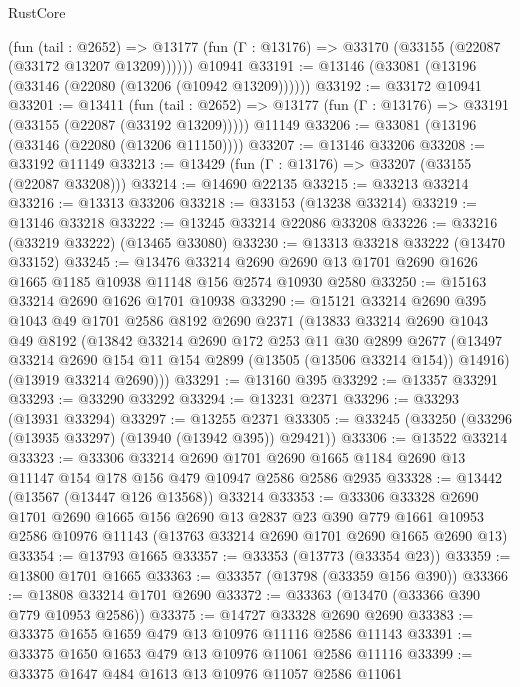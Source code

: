 \begin{lexlean}{RustCore}
\begin{coremodule}
      (fun (tail : @2652) =>
      @13177 (fun (Γ : @13176) => @33170 (@33155 (@22087 (@33172 @13207 @13209))))))
    @10941
@33191 := @13146 (@33081 (@13196 (@33146 (@22080 (@13206 (@10942 @13209))))))
@33192 := @33172 @10941
@33201 := @13411
    (fun (tail : @2652) => @13177 (fun (Γ : @13176) => @33191 (@33155 (@22087 (@33192 @13209)))))
    @11149
@33206 := @33081 (@13196 (@33146 (@22080 (@13206 @11150))))
@33207 := @13146 @33206
@33208 := @33192 @11149
@33213 := @13429 (fun (Γ : @13176) => @33207 (@33155 (@22087 @33208)))
@33214 := @14690 @22135
@33215 := @33213 @33214
@33216 := @13313 @33206
@33218 := @33153 (@13238 @33214)
@33219 := @13146 @33218
@33222 := @13245 @33214 @22086 @33208
@33226 := @33216 (@33219 @33222) (@13465 @33080)
@33230 := @13313 @33218 @33222 (@13470 @33152)
@33245 := @13476
    @33214
    @2690
    @2690
    @13
    @1701
    @2690
    @1626
    @1665
    @1185
    @10938
    @11148
    @156
    @2574
    @10930
    @2580
@33250 := @15163 @33214 @2690 @1626 @1701 @10938
@33290 := @15121
    @33214
    @2690
    @395
    @1043
    @49
    @1701
    @2586
    @8192
    @2690
    @2371
    (@13833
      @33214
      @2690
      @1043
      @49
      @8192
      (@13842
        @33214
        @2690
        @172
        @253
        @11
        @30
        @2899
        @2677
        (@13497 @33214 @2690 @154 @11 @154 @2899 (@13505 (@13506 @33214 @154)) @14916)
        (@13919 @33214 @2690)))
@33291 := @13160 @395
@33292 := @13357 @33291
@33293 := @33290 @33292
@33294 := @13231 @2371
@33296 := @33293 (@13931 @33294)
@33297 := @13255 @2371
@33305 := @33245 (@33250 (@33296 (@13935 @33297) (@13940 (@13942 @395)) @29421))
@33306 := @13522 @33214
@33323 := @33306
    @33214
    @2690
    @1701
    @2690
    @1665
    @1184
    @2690
    @13
    @11147
    @154
    @178
    @156
    @479
    @10947
    @2586
    @2586
    @2935
@33328 := @13442 (@13567 (@13447 @126 @13568)) @33214
@33353 := @33306
    @33328
    @2690
    @1701
    @2690
    @1665
    @156
    @2690
    @13
    @2837
    @23
    @390
    @779
    @1661
    @10953
    @2586
    @10976
    @11143
    (@13763 @33214 @2690 @1701 @2690 @1665 @2690 @13)
@33354 := @13793 @1665
@33357 := @33353 (@13773 (@33354 @23))
@33359 := @13800 @1701 @1665
@33363 := @33357 (@13798 (@33359 @156 @390))
@33366 := @13808 @33214 @1701 @2690
@33372 := @33363 (@13470 (@33366 @390 @779 @10953 @2586))
@33375 := @14727 @33328 @2690 @2690
@33383 := @33375 @1655 @1659 @479 @13 @10976 @11116 @2586 @11143
@33391 := @33375 @1650 @1653 @479 @13 @10976 @11061 @2586 @11116
@33399 := @33375 @1647 @484 @1613 @13 @10976 @11057 @2586 @11061

\end{coremodule}
\end{lexlean}
